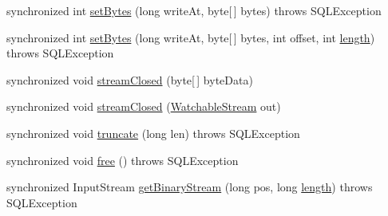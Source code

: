 \begin{DoxyCompactItemize}
\item 
synchronized int \mbox{\hyperlink{classcom_1_1mysql_1_1cj_1_1jdbc_1_1_blob_a34f9a18a23ec153717f7b191dae58ab4}{set\+Bytes}} (long write\+At, byte\mbox{[}$\,$\mbox{]} bytes)  throws S\+Q\+L\+Exception 
\item 
synchronized int \mbox{\hyperlink{classcom_1_1mysql_1_1cj_1_1jdbc_1_1_blob_a5c16cdab1cc1ff37a3b1267dec9d6b28}{set\+Bytes}} (long write\+At, byte\mbox{[}$\,$\mbox{]} bytes, int offset, int \mbox{\hyperlink{classcom_1_1mysql_1_1cj_1_1jdbc_1_1_blob_a21cf04a4632ad74337cf8a867bae61e3}{length}})  throws S\+Q\+L\+Exception 
\item 
synchronized void \mbox{\hyperlink{classcom_1_1mysql_1_1cj_1_1jdbc_1_1_blob_a13587ebf1755da02db82fb506459e225}{stream\+Closed}} (byte\mbox{[}$\,$\mbox{]} byte\+Data)
\item 
synchronized void \mbox{\hyperlink{classcom_1_1mysql_1_1cj_1_1jdbc_1_1_blob_a891c76fb3123f5d9f736e05d50ed1fe8}{stream\+Closed}} (\mbox{\hyperlink{interfacecom_1_1mysql_1_1cj_1_1protocol_1_1_watchable_stream}{Watchable\+Stream}} out)
\item 
synchronized void \mbox{\hyperlink{classcom_1_1mysql_1_1cj_1_1jdbc_1_1_blob_a423c316889dc06f59cbaee6f77c6401f}{truncate}} (long len)  throws S\+Q\+L\+Exception 
\item 
synchronized void \mbox{\hyperlink{classcom_1_1mysql_1_1cj_1_1jdbc_1_1_blob_a60c2e9853dd25824771ebfd142d89f2d}{free}} ()  throws S\+Q\+L\+Exception 
\item 
synchronized Input\+Stream \mbox{\hyperlink{classcom_1_1mysql_1_1cj_1_1jdbc_1_1_blob_a000b7ade4e7fea17e5d40085a2a9dabe}{get\+Binary\+Stream}} (long pos, long \mbox{\hyperlink{classcom_1_1mysql_1_1cj_1_1jdbc_1_1_blob_a21cf04a4632ad74337cf8a867bae61e3}{length}})  throws S\+Q\+L\+Exception 
\end{DoxyCompactItemize}


